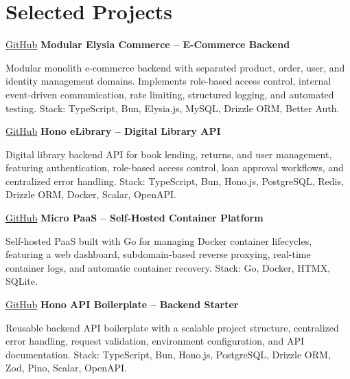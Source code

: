 \section{Selected Projects}

\samepage
\begin{twocolentrylink}{
		\href{https://github.com/masmuss/modular-elysia-commerce}{GitHub}
	}
	\textbf{Modular Elysia Commerce -- E-Commerce Backend}
\end{twocolentrylink}
\begin{onecolentry}
	Modular monolith e-commerce backend with separated product, order, user, and identity management domains. Implements role-based access control, internal event-driven communication, rate limiting, structured logging, and automated testing. Stack: TypeScript, Bun, Elysia.js, MySQL, Drizzle ORM, Better Auth.
\end{onecolentry}

\vspace{0.3 cm}


\samepage
\begin{twocolentrylink}{
		\href{https://github.com/masmuss/hono-elibrary}{GitHub}
	}
	\textbf{Hono eLibrary -- Digital Library API}
\end{twocolentrylink}
\begin{onecolentry}
	Digital library backend API for book lending, returns, and user management, featuring authentication, role-based access control, loan approval workflows, and centralized error handling. Stack: TypeScript, Bun, Hono.js, PostgreSQL, Redis, Drizzle ORM, Docker, Scalar, OpenAPI.
\end{onecolentry}

\vspace{0.3 cm}


\samepage
\begin{twocolentrylink}{
		\href{https://github.com/masmuss/micro-paas}{GitHub}
	}
	\textbf{Micro PaaS -- Self-Hosted Container Platform}
\end{twocolentrylink}
\begin{onecolentry}
	Self-hosted PaaS built with Go for managing Docker container lifecycles, featuring a web dashboard, subdomain-based reverse proxying, real-time container logs, and automatic container recovery. Stack: Go, Docker, HTMX, SQLite.
\end{onecolentry}

\vspace{0.3 cm}


\samepage
\begin{twocolentrylink}{
		\href{https://github.com/masmuss/hono-api-boilerplate}{GitHub}
	}
	\textbf{Hono API Boilerplate -- Backend Starter}
\end{twocolentrylink}
\begin{onecolentry}
	Reusable backend API boilerplate with a scalable project structure, centralized error handling, request validation, environment configuration, and API documentation. Stack: TypeScript, Bun, Hono.js, PostgreSQL, Drizzle ORM, Zod, Pino, Scalar, OpenAPI.
\end{onecolentry}

